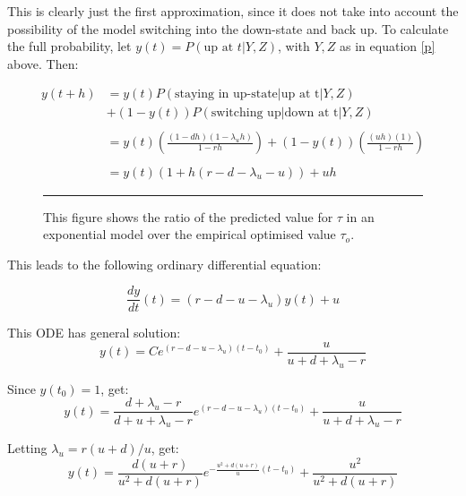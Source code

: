 This is clearly just the first approximation, since it does not take into account the possibility of the model switching into the down-state and back up.  To calculate the full probability, let $y(t) = P(\mbox{up at } t | Y , Z)$, with $Y,Z$ as in equation \ref{p} above.  Then:

\begin{equation}
\begin{split}
y(t+h) &=  y(t)P(\mbox{staying in up-state} | \mbox{up at t}|Y,Z)  \\
& + (1-y(t))P(\mbox{switching up} | \mbox{down at t}|Y,Z)\\
&\\
&= y(t)\left( \frac{(1-dh)(1-\lambda_uh)}{1-rh} \right) + (1-y(t)) \left(\frac{(uh)(1)}{1-rh}  \right)\\
&\\
& = y(t)\left( 1 + h(r-d-\lambda_u-u ) \right) + uh
\end{split}
\end{equation}

\begin{figure}[b!]
\begin{center}
\resizebox{0.75\textwidth}{!}{}
\bigskip
\rule{35em}{0.5pt}
\caption{\label{predovertauopt} This figure shows the ratio of the predicted value for $\tau$ in an exponential model over the empirical optimised value $\tau_o$.}
\end{center}
\end{figure}

This leads to the following ordinary differential equation:

\begin{equation}
\frac{dy}{dt}(t) = \left( r - d - u - \lambda_u \right)y(t) + u
\end{equation}

This ODE has general solution:
\begin{equation}
y(t) = Ce^{(r-d-u-\lambda_u)(t-t_0)} + \frac{u}{u+d+\lambda_u - r}
\end{equation}

Since $y(t_0) = 1$, get:
\begin{equation}
y(t) = \frac{d+\lambda_u - r}{d+u+\lambda_u -r} e^{(r-d-u-\lambda_u)(t-t_0)} + \frac{u}{u+d+\lambda_u-r}
\end{equation}

Letting $\lambda_u = r(u+d)/u$, get:
\begin{equation}
y(t) = \frac{d(u+r)}{u^2 + d(u+r)} e^{-\frac{u^2+d(u+r)}{u}(t-t_0)} + \frac{u^2}{u^2+ d(u+r)}
\end{equation}

